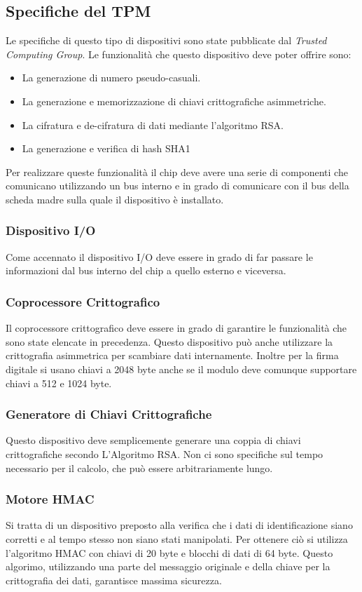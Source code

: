 \subsection{Specifiche del TPM}
Le specifiche di questo tipo di dispositivi sono state pubblicate dal \textit{Trusted Computing Group}. Le funzionalità che questo dispositivo deve poter offrire sono:
\begin{itemize}
    \item La generazione di numero pseudo-casuali.
    \item La generazione e memorizzazione di chiavi crittografiche asimmetriche.
    \item La cifratura e de-cifratura di dati mediante l'algoritmo RSA.
    \item La generazione e verifica di hash SHA1
\end{itemize}
Per realizzare queste funzionalità il chip deve avere una serie di componenti che comunicano utilizzando un bus interno e in grado di comunicare con il bus della scheda madre sulla quale il dispositivo è installato.

\subsubsection{Dispositivo I/O}
Come accennato il dispositivo I/O deve essere in grado di far passare le informazioni dal bus interno del chip a quello esterno e viceversa.

\subsubsection{Coprocessore Crittografico}
Il coprocessore crittografico deve essere in grado di garantire le funzionalità che sono state elencate in precedenza. Questo dispositivo può anche utilizzare la crittografia asimmetrica per scambiare dati internamente. Inoltre per la firma digitale si usano chiavi a 2048 byte anche se il modulo deve comunque supportare chiavi a 512 e 1024 byte.

\subsubsection{Generatore di Chiavi Crittografiche}
Questo dispositivo deve semplicemente generare una coppia di chiavi crittografiche secondo L'Algoritmo RSA. Non ci sono specifiche sul tempo necessario per il calcolo, che può essere arbitrariamente lungo.

\subsubsection{Motore HMAC}
Si tratta di un dispositivo preposto alla verifica che i dati di identificazione siano corretti e al tempo stesso non siano stati manipolati. Per ottenere ciò si utilizza l'algoritmo HMAC con chiavi di 20 byte e blocchi di dati di 64 byte. Questo algorimo, utilizzando una parte del messaggio originale e della chiave per la crittografia dei dati, garantisce massima sicurezza.

